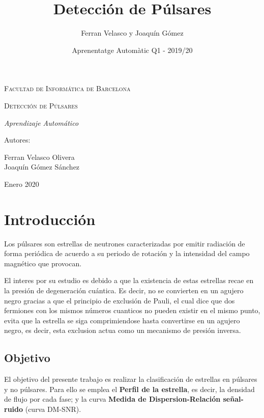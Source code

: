 \documentclass[a4paper]{article} %
\title{\fontsize{100}{20}\selectfont Detección de Púlsares}
\author{\large Ferran Velasco y Joaquín Gómez}
\date{Aprenentatge Automàtic Q1 - 2019/20}
\begin{document}
\renewcommand\tablename {Tabla}

\thispagestyle{empty}
\begin{titlepage}
\centering
{\scshape\LARGE Facultad de Informática de Barcelona \par}
\vspace{3cm}
{\scshape\Huge Detección de Púlsares \par}
\vspace{3cm}
{\itshape\Large Aprendizaje Automático \par}
\vfill
{\Large Autores: \par}
{\Large Ferran Velasco Olivera\\ Joaquín Gómez Sánchez \par}
\vfill
{\Large Enero 2020 \par}
\end{titlepage}

\newpage
\tableofcontents
\newpage


\section{Introducción}

Los púlsares son estrellas de neutrones caracterizadas por emitir radiación de forma periódica de acuerdo a su periodo de rotación y la intensidad del campo magnético que provocan.\vspace{5mm} 

El interes por su estudio es debido a que la existencia de estas estrellas recae en la presión de degeneración cuántica. Es decir, no se convierten en un agujero negro gracias a que el principio de exclusión de Pauli, el cual dice que dos fermiones con los mismos números cuanticos no pueden existir en el mismo punto, evita que la estrella se siga comprimiendose hasta convertirse en un agujero negro, es decir, esta exclusion actua como un mecanismo de presión inversa.

\subsection{Objetivo}

El objetivo del presente trabajo es realizar la clasificación de estrellas en púlsares y no púlsares. Para ello se emplea el \textbf{Perfil de la estrella}, es decir, la densidad de flujo por cada fase; y la curva \textbf{Medida de Dispersion-Relación señal-ruido} (curva DM-SNR).
\end{document}
